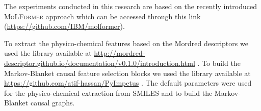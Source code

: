 The experiments conducted in this research are based on the recently introduced \textsc{MoLFormer} approach which can be accessed through this link (\url{https://github.com/IBM/molformer}). 

To extract the physico-chemical features based on the Mordred descriptors we used the library available at \url{http://mordred-descriptor.github.io/documentation/v0.1.0/introduction.html} \cite{moriwaki2018mordred}. To build the Markov-Blanket causal feature selection blocks we used the library available at \url{https://github.com/atif-hassan/PyImpetus} \cite{hassan2021ppfs}. The default parameters were used for the physico-chemical extraction from SMILES and to build the Markov-Blanket causal graphs.




